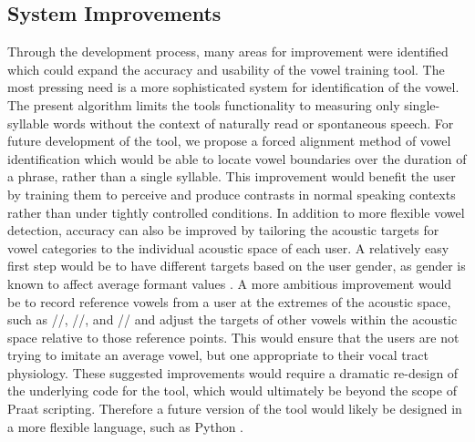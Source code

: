 \subsection{System Improvements}
Through the development process, many areas for improvement were identified which could expand the accuracy and usability of the vowel training tool. The most pressing need is a more sophisticated system for identification of the vowel. The present algorithm limits the tools functionality to measuring only single-syllable words without the context of naturally read or spontaneous speech. For future development of the tool, we propose a forced alignment method of vowel identification which would be able to locate vowel boundaries over the duration of a phrase, rather than a single syllable. This improvement would benefit the user by training them to perceive and produce contrasts in normal speaking contexts rather than under tightly controlled conditions. In addition to more flexible vowel detection, accuracy can also be improved by tailoring the acoustic targets for vowel categories to the individual acoustic space of each user. A relatively easy first step would be to have different targets based on the user gender, as gender is known to affect average formant values \cite{patzold1997acoustic}. A more ambitious improvement would be to record reference vowels from a user at the extremes of the acoustic space, such as //, //, and // and adjust the targets of other vowels within the acoustic space relative to those reference points. This would ensure that the users are not trying to imitate an average vowel, but one appropriate to their vocal tract physiology. These suggested improvements would require a dramatic re-design of the underlying code for the tool, which would ultimately be beyond the scope of Praat scripting. Therefore a future version of the tool would likely be designed in a more flexible language, such as Python \cite{python}. 

